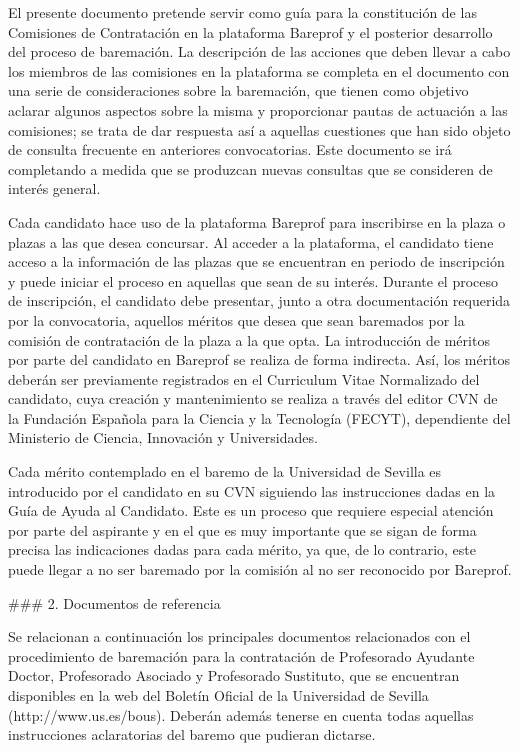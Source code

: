 \documentclass{article}
\begin{document}
\begin{itemize}
\begin{itemize}
\begin{scriptsize}
                  El presente documento pretende servir como guía para la constitución de las Comisiones de Contratación en la plataforma Bareprof y el posterior desarrollo del proceso de baremación. La descripción de las acciones que deben llevar a cabo los miembros de las comisiones en la plataforma se completa en el documento con una serie de consideraciones sobre la baremación, que tienen como objetivo aclarar algunos aspectos sobre la misma y proporcionar pautas de actuación a las comisiones; se trata de dar respuesta así a aquellas cuestiones que han sido objeto de consulta frecuente en anteriores convocatorias. Este documento se irá completando a medida que se produzcan nuevas consultas que se consideren de interés general.

                  Cada candidato hace uso de la plataforma Bareprof para inscribirse en la plaza o plazas a las que desea concursar. Al acceder a la plataforma, el candidato tiene acceso a la información de las plazas que se encuentran en periodo de inscripción y puede iniciar el proceso en aquellas que sean de su interés. Durante el proceso de inscripción, el candidato debe presentar, junto a otra documentación requerida por la convocatoria, aquellos méritos que desea que sean baremados por la comisión de contratación de la plaza a la que opta. La introducción de méritos por parte del candidato en Bareprof se realiza de forma indirecta. Así, los méritos deberán ser previamente registrados en el Curriculum Vitae Normalizado del candidato, cuya creación y mantenimiento se realiza a través del editor CVN de la Fundación Española para la Ciencia y la Tecnología (FECYT), dependiente del Ministerio de Ciencia, Innovación y Universidades.

                  Cada mérito contemplado en el baremo de la Universidad de Sevilla es introducido por el candidato en su CVN siguiendo las instrucciones dadas en la Guía de Ayuda al Candidato. Este es un proceso que requiere especial atención por parte del aspirante y en el que es muy importante que se sigan de forma precisa las indicaciones dadas para cada mérito, ya que, de lo contrario, este puede llegar a no ser baremado por la comisión al no ser reconocido por Bareprof.

                  \#\#\# 2. Documentos de referencia

                  Se relacionan a continuación los principales documentos relacionados con el procedimiento de baremación para la contratación de Profesorado Ayudante Doctor, Profesorado Asociado y Profesorado Sustituto, que se encuentran disponibles en la web del Boletín Oficial de la Universidad de Sevilla (http://www.us.es/bous). Deberán además tenerse en cuenta todas aquellas instrucciones aclaratorias del baremo que pudieran dictarse.


\end{scriptsize}
\end{itemize}
\end{itemize}
\end{document}
